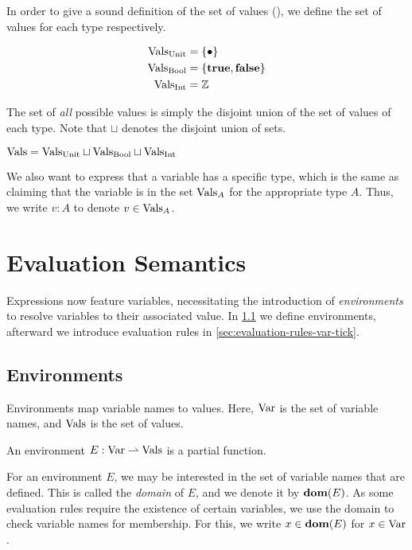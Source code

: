 In order to give a sound definition of the set of values (\Vals), we define the set of values for each type respectively. 

\begin{align*}
   \text{Vals}_{\text{Unit}} & = \{\bullet\} \\
   \text{Vals}_{\text{Bool}} & = \{\mathbf{true}, \mathbf{false}\} \\
   \text{Vals}_{\text{Int}} & = \mathbb{Z}
\end{align*}

The set of \emph{all} possible values is simply the disjoint union of the set of values of each type. Note that \(\sqcup\) denotes the disjoint union of sets.

\begin{definition}\label{def:vals}
   \(\text{Vals} = \text{Vals}_{\text{Unit}} \sqcup \text{Vals}_{\text{Bool}} \sqcup \text{Vals}_{\text{Int}}\)
\end{definition}

We also want to express that a variable has a specific type, which is the same as claiming that the variable is in the set \(\text{Vals}_{A}\) for the appropriate type \(A\). Thus, we write \(v : A\) to denote \(v \in \text{Vals}_{A}\).


\section{Evaluation Semantics}

Expressions now feature variables, necessitating the introduction of \emph{environments} to resolve variables to their associated value. In \cref{sec:environments} we define environments, afterward we introduce evaluation rules in \cref{sec:evaluation-rules-var-tick}.

\subsection{Environments}\label{sec:environments}

Environments map variable names to values. Here, \(\text{Var}\) is the set of variable names, and \(\text{Vals}\) is the set of values. 

\begin{definition}[Environment]\label{def:environment}
   An environment \(E: \text{Var} \rightharpoonup \text{\ensuremath{\text{Vals}}}\) is a partial function.
\end{definition}

For an environment \(E\), we may be interested in the set of variable names that are defined. This is called the \emph{domain} of \(E\), and we denote it by \(\textbf{dom}(E)\). As some evaluation rules require the existence of certain variables, we use the domain to check variable names for membership. For this, we write \(x \in \textbf{dom}(E)\) for \(x \in \text{Var}\).

